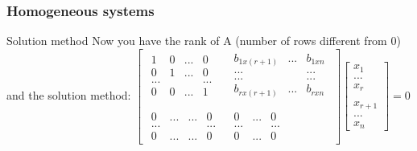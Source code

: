 \begin{frame}
	\frametitle{Homogeneous systems}
	\begin{block}{Solution method}
		Now you have the rank of A (number of rows different from 0) and the solution method:
		$\begin{bmatrix}
		\begin{matrix}
			1 & 0 &...& 0\\
			0 & 1 &... & 0\\
			... & & & ...\\
			0 & 0 &... & 1\\
			& & &
			\end{matrix} & \begin{matrix}
		b_{1x(r+1)} & ... & b_{1xn}\\
		... & & ...\\
		... & & ...\\
		b_{rx(r+1)} & ... & b_{rxn}\\
		& & 
		\end{matrix}\\
		\begin{matrix}
		0 & ... & ... & 0\\
		... & & & ...\\
		0 & ... & ... & 0
		\end{matrix} & \begin{matrix}
		0 & ... & 0\\
		... & & ...\\
		0 & ... & 0
		\end{matrix}
		\end{bmatrix}\begin{bmatrix}
		x_1\\...\\x_r\\ \\x_{r+1}\\...\\x_n
		\end{bmatrix}=0$
	\end{block}
\end{frame}

